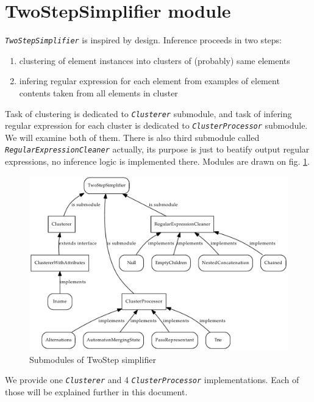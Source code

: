 \documentclass[a4paper,10pt,oneside]{article}
\newcommand{\myscale}{0.74}
\newcommand{\jmodule}[1]{\texttt{\textit{#1}}}
\begin{document}
\section{TwoStepSimplifier module}
\jmodule{TwoStepSimplifier} is inspired by \cite{1802522} design. Inference proceeds in two steps:
\begin{enumerate}
	\item clustering of element instances into clusters of (probably) same elements
	\item infering regular expression for each element from examples of element contents taken from all elements in cluster
\end{enumerate}
Task of clustering is dedicated to \jmodule{Clusterer} submodule, and task of infering regular expression for each cluster is dedicated to \jmodule{ClusterProcessor} submodule. We will examine both of them.
There is also third submodule called \jmodule{RegularExpressionCleaner} actually, its purpose is just to beatify output regular expressions, no inference logic is implemented there. 
Modules are drawn on fig. \ref{twostep_modules}.
\begin{figure}
	\centering\includegraphics[scale=\myscale]{twostep_modules}
	\caption{Submodules of TwoStep simplifier} \label{twostep_modules}
\end{figure}
We provide one \jmodule{Clusterer} and 4 \jmodule{ClusterProcessor} implementations.
Each of those will be explained further in this document.
\end{document}
